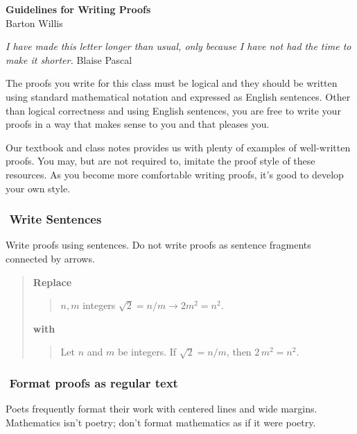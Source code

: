 \documentclass[12pt]{article}
\newcounter{ex}\setcounter{ex}{0}
\newcommand{\ex}{%
\hspace{-0.2in} \setcounter{ex}{\value{ex}+1}
\theex \,\,}
\newcounter{id}\setcounter{id}{0}
\newcounter{se}\setcounter{se}{0}
\begin{document}
\begin{flushleft}
\textbf{Guidelines for Writing Proofs} \\
 Barton Willis
\end{flushleft}


\begin{flushleft}
  \small
  \emph{I have made this letter longer than usual, only because I have
  not had the time to make it shorter.} \hfill {\sc Blaise Pascal}
\end{flushleft}

\normalsize
The proofs you write for this class must be logical and they should be 
written using standard mathematical notation and expressed as English sentences. Other than 
logical correctness and using English sentences, you are free to write your proofs
in a way that makes sense to you and that pleases you.

Our textbook and class notes provides us with plenty of examples of well-written proofs. You may,
but are not required to, imitate the proof style of these resources. As you become
more comfortable writing proofs, it's good to develop your own style.


\subsubsection*{\ex Write Sentences}

Write proofs using sentences. Do not write proofs as sentence fragments connected by 
arrows.
\begin{quote}
\textbf{Replace}
\begin{quote}
\(n,m\) integers \(\sqrt{2} = n / m  \longrightarrow 2 m^2 = n^2\). 
\end{quote}
\textbf{with}
\begin{quote}
Let \(n\) and \(m\) be integers. If \(\sqrt{2} = n / m\), then \(2 \, m^2 = n^2\).
\end{quote}
\end{quote}


\subsubsection*{\ex  Format proofs as regular text}

Poets frequently format their work  with centered lines and wide
margins. Mathematics isn't poetry; don't format mathematics as if it were poetry.
\end{document}

